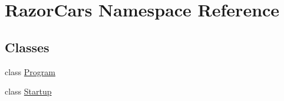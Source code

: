 \hypertarget{namespace_razor_cars}{}\section{Razor\+Cars Namespace Reference}
\label{namespace_razor_cars}
\subsection*{Classes}
\begin{DoxyCompactItemize}
\item 
class \mbox{\hyperlink{class_razor_cars_1_1_program}{Program}}
\item 
class \mbox{\hyperlink{class_razor_cars_1_1_startup}{Startup}}
\end{DoxyCompactItemize}
